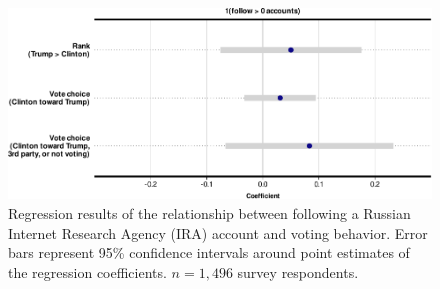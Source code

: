 \documentclass[
  12pt,
]{article}
\begin{document}
\begin{figure}
\centering
\includegraphics{Appendix_files/figure-latex/Figure-E7-1.pdf}
\caption{\label{fig:Figure-E7}Regression results of the relationship between following a Russian Internet Research Agency (IRA) account and voting behavior. Error bars represent 95\% confidence intervals around point estimates of the regression coefficients. \(n = 1,496\) survey respondents.}
\end{figure}
\end{document}
